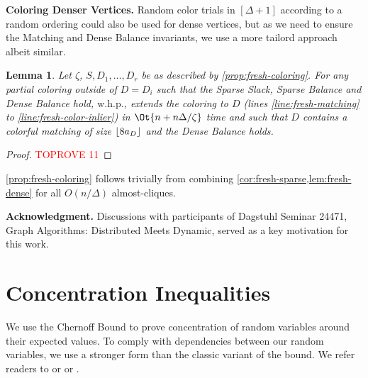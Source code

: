 \documentclass[a4paper,english,11pt]{amsart}
\renewcommand{\paragraph}[1]{\medskip\noindent\textbf{#1}}
\newtheorem{lemma}{Lemma}[section]
\theoremstyle{definition}
\DeclarePairedDelimiter{\floor}{\lfloor}{\rfloor}
\newcommand{\whp}{$\text{w.h.p.}$\xspace}
\begin{document}
\paragraph{Coloring Denser Vertices.}
Random color trials in $[\Delta+1]$ according to a random ordering could also be used for dense vertices, but as we need to ensure the Matching and Dense Balance invariants, we use a more tailord approach albeit similar.

\begin{lemma}
    \label{lem:fresh-dense}
    Let $\zeta$, $S, D_1, \ldots, D_r$ be as described by \cref{prop:fresh-coloring}. For any partial coloring outside of $D = D_i$ such that the Sparse Slack, Sparse Balance and Dense Balance hold, \whp, \FreshColoring extends the coloring to $D$ (lines \ref{line:fresh-matching} to \ref{line:fresh-color-inlier}) in $\Ot{ n + n\Delta/\zeta }$ time and such that $D$ contains a colorful matching of size $\floor{ 8 a_D }$ and the Dense Balance holds.
\end{lemma}

\begin{proof}\textcolor{red}{TOPROVE 11}\end{proof}

\cref{prop:fresh-coloring} follows trivially from combining \cref{cor:fresh-sparse,lem:fresh-dense} for all $O(n/\Delta)$ almost-cliques.

 
\paragraph{Acknowledgment.}
Discussions with participants of Dagstuhl Seminar 24471, Graph Algorithms: Distributed Meets Dynamic, served as a key motivation for this work.





\appendix




\section{Concentration Inequalities}
We use the Chernoff Bound to prove concentration of random variables around their expected values. To comply with dependencies between our random variables, we use a stronger form than the classic variant of the bound. We refer readers to \cite{DP09} or \cite[Section 1.10]{Doerr2020} or \cite[Corollaries 6 and 14]{KQ21}.
\end{document}
